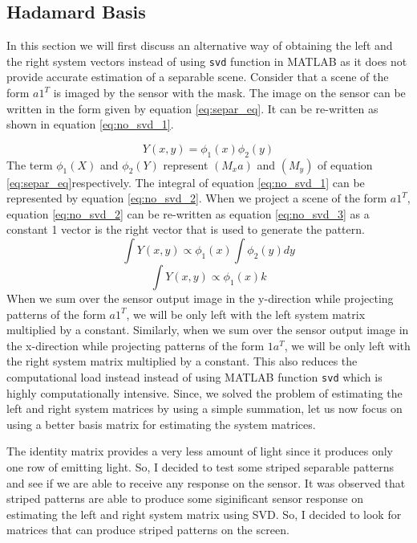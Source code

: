 \subsection{Hadamard Basis}
In this section we will first discuss an alternative way of obtaining the left and the right system vectors instead of using \texttt{svd} function in MATLAB as it does not provide accurate estimation of a separable scene. Consider that a scene of the form $a1^T$ is imaged by the sensor with the mask. The image on the sensor can be written in the form given by equation \ref{eq:separ_eq}. It can be re-written as shown in equation \ref{eq:no_svd_1}.

\begin{equation}
Y(x,y) = \phi_1(x)\phi_2(y)
\label{eq:no_svd_1}
\end{equation}
The term $\phi_1(X)$ and $\phi_2(Y)$ represent $(M_xa)$ and $(M_y)$ of equation \ref{eq:separ_eq}respectively. The integral of equation \ref{eq:no_svd_1} can be represented by equation \ref{eq:no_svd_2}. When we project a scene of the form $a1^T$, equation \ref{eq:no_svd_2} can be re-written as equation \ref{eq:no_svd_3} as a constant 1 vector is the right vector that is used to generate the pattern.
\begin{equation}
\int Y(x,y) \propto \phi_1(x)\int \phi_2(y)dy
\label{eq:no_svd_2}
\end{equation}
\begin{equation}
\int Y(x,y) \propto \phi_1(x) k
\label{eq:no_svd_3}
\end{equation}
When we sum over the sensor output image in the y-direction while projecting  patterns of the  form $a1^T$, we will be only left with the left system matrix multiplied by a constant. Similarly, when we sum over the sensor output image in the x-direction while projecting  patterns of the  form $1a^T$, we will be only left with the right system matrix multiplied by a constant. This also reduces the computational load instead instead of using MATLAB function \texttt{svd} which is highly computationally intensive. Since, we solved the problem of estimating the left and right system matrices by using a simple summation, let us now focus on using a better basis matrix for estimating the system matrices. 

The identity matrix provides a very less amount of light since it produces only one row of emitting light. So, I decided to test some striped separable patterns and see if we are able to receive any response on the sensor. It was observed that striped patterns are able to produce some siginificant sensor response on estimating the left and right system matrix using SVD. So, I decided to look for matrices that can produce striped patterns on the screen. 

